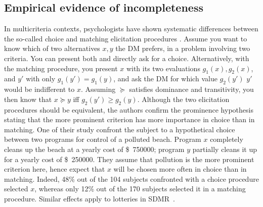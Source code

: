 \documentclass[french, english]{llncs}
\newcommand{\dollars}[1]{\SI{#1}[\$]{}}
\begin{document}
\subsection{Empirical evidence of incompleteness}
\label{sec:evidence}
In multicriteria contexts, psychologists have shown systematic differences between the so-called choice and matching elicitation procedures \citep{tversky_contingent_1988}. Assume you want to know which of two alternatives $x, y$ the \ac{DM} prefers, in a problem involving two criteria. You can present both and directly ask for a choice. Alternatively, with the matching procedure, you present $x$ with its two evaluations $g_1(x), g_2(x)$, and $y'$ with only $g_1(y') = g_1(y)$, and ask the \ac{DM} for which value $g_2(y')$ $y'$ would be indifferent to $x$. Assuming $\succeq$ satisfies dominance and transitivity, you then know that $x \succeq y$ iff $g_2(y') ≥ g_2(y)$. Although the two elicitation procedures should be equivalent, the authors confirm the prominence hypothesis stating that the more prominent criterion has more importance in choice than in matching. One of their study confront the subject to a hypothetical choice between two programs for control of a polluted beach. Program $x$ completely cleans up the beach at a yearly cost of \dollars{750 000}; program $y$ partially cleans it up for a yearly cost of \dollars{250 000}. They assume that pollution is the more prominent criterion here, hence expect that $x$ will be chosen more often in choice than in matching. Indeed, 48\% out of the 104 subjects confronted with a choice procedure selected $x$, whereas only 12\% out of the 170 subjects selected it in a matching procedure. Similar effects apply to lotteries in SDMR~\citep{luce_utility_2000}.
	
	
\end{document}
